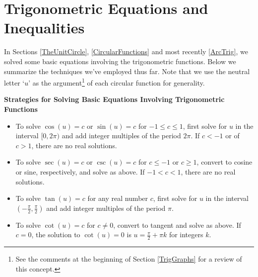 \section{Trigonometric Equations and Inequalities}


\label{TrigEquIneq}

In Sections \ref{TheUnitCircle}, \ref{CircularFunctions} and most recently \ref{ArcTrig}, we solved some basic equations involving the trigonometric functions. Below we summarize the techniques we've employed thus far.  Note that we use the neutral letter `$u$' as the argument\footnote{See the comments at the beginning of Section \ref{TrigGraphs} for a review of this concept.} of each circular function for generality.

\smallskip

\label{trigeqnstrategy1}

\colorbox{ResultColor}{\bbm
\centerline{\textbf{Strategies for Solving Basic Equations Involving Trigonometric Functions}}

\smallskip

\begin{itemize}

\item To solve $\cos(u) = c$ or $\sin(u) = c$ for $-1 \leq c \leq 1$, first solve for $u$ in the interval $[0,2\pi)$ and add integer multiples of the period $2\pi$.  If $c < -1$ or of $c > 1$, there are no real solutions.

\item To solve $\sec(u) = c$ or $\csc(u) = c$ for $c \leq -1$ or $c \geq 1$,  convert to cosine or sine, respectively, and solve as above.  If $-1 < c < 1$, there are no real solutions.

\item To solve  $\tan(u) = c$ for any real number $c$,  first solve for $u$ in the interval $\left(-\frac{\pi}{2}, \frac{\pi}{2}\right)$ and add integer multiples of the period $\pi$.

\item  To solve  $\cot(u) = c$ for $c \neq 0$, convert to tangent and solve as above.  If $c = 0$, the solution to $\cot(u) = 0$ is $u = \frac{\pi}{2} + \pi k$ for integers $k$.

\end{itemize}

\ebm}

\smallskip

